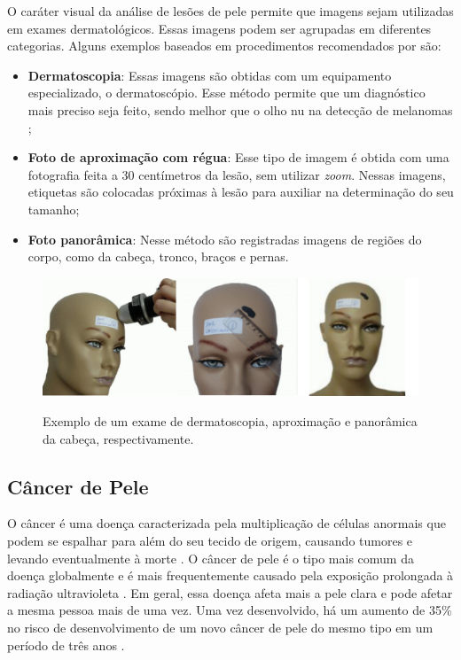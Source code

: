 O caráter visual da análise de lesões de pele permite que imagens sejam utilizadas em exames dermatológicos. Essas
imagens podem ser agrupadas em diferentes categorias. Alguns exemplos baseados em procedimentos recomendados por
\textcite{fotos_dermatologia} são:

\begin{itemize}
    \item \textbf{Dermatoscopia}: Essas imagens são obtidas com um equipamento especializado, o dermatoscópio. Esse método
          permite que um diagnóstico mais preciso seja feito, sendo melhor que o olho nu na detecção de melanomas
          \cite{dermatoscopy};
    \item \textbf{Foto de aproximação com régua}: Esse tipo de imagem é obtida com uma fotografia feita a 30 centímetros da
          lesão, sem utilizar \textit{zoom}. Nessas imagens, etiquetas são colocadas próximas à lesão para auxiliar na
          determinação do seu tamanho;
    \item \textbf{Foto panorâmica}: Nesse método são registradas imagens de regiões do corpo, como da cabeça, tronco, braços e
          pernas.
\end{itemize}

\begin{figure}[ht]
    \centering
    \caption{\small Exemplo de um exame de dermatoscopia, aproximação e panorâmica da cabeça, respectivamente.}
    \includegraphics[width=1\columnwidth,keepaspectratio]{images/skin_lesion_exams.png}
    \label{fig:skin_lesion_exams}
\end{figure}

\subsection{Câncer de Pele} \label{sec:skin_cancer}

O câncer é uma doença caracterizada pela multiplicação de células anormais que podem se espalhar para além do seu
tecido de origem, causando tumores e levando eventualmente à morte \cite{cancer}. O câncer de pele é o tipo mais comum
da doença globalmente e é mais frequentemente causado pela exposição prolongada à radiação ultravioleta
\cite{skin_cancer}. Em geral, essa doença afeta mais a pele clara e pode afetar a mesma pessoa mais de uma vez. Uma vez
desenvolvido, há um aumento de 35\% no risco de desenvolvimento de um novo câncer de pele do mesmo tipo em um período
de três anos \cite{skin_cancer_zink}.


